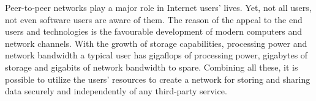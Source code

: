 Peer-to-peer networks play a major role in Internet users' lives.
Yet, not all users, not even \pp software users are aware of them.
The reason of the appeal to the end users and \pp technologies
is the favourable development of modern computers and network channels.
With the growth of storage capabilities, processing power and network
bandwidth a typical user has gigaflops of processing power, gigabytes
of storage and gigabits of network bandwidth to spare. Combining all
these, it is possible to utilize the users' resources to create a
\pp network for storing and sharing data securely and independently
of any third-party service.
